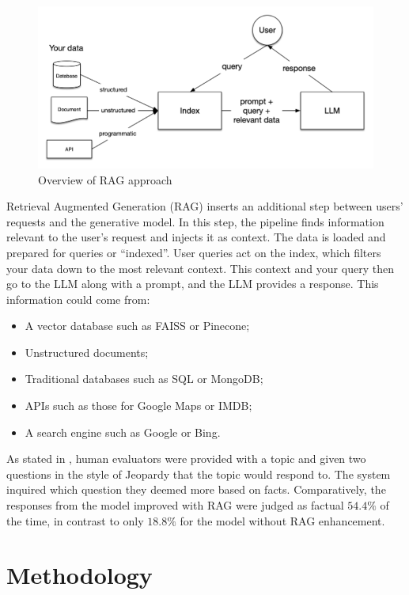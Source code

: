 \documentclass[conference, 11pt]{IEEEtran}
\begin{document}
\begin{figure}[h]
\centering
\includegraphics[width=1.0\linewidth]{basic_rag.png}
\caption{Overview of RAG approach \cite{llamaindex_rag}}
\end{figure}

Retrieval Augmented Generation (RAG) \cite{rag} inserts an additional step between users' requests and the generative model. In this step, the pipeline finds information relevant to the user's request and injects it as context. The data is loaded and prepared for queries or ``indexed''. User queries act on the index, which filters your data down to the most relevant context. This context and your query then go to the LLM along with a prompt, and the LLM provides a response. This information could come from:
\begin{itemize}
    \item A vector database such as FAISS or Pinecone;
    \item Unstructured documents;
    \item Traditional databases such as SQL or MongoDB;
    \item APIs such as those for Google Maps or IMDB;
    \item A search engine such as Google or Bing.
\end{itemize}

As stated in \cite{rag}, human evaluators were provided with a topic and given two questions in the style of Jeopardy that the topic would respond to. The system inquired which question they deemed more based on facts. Comparatively, the responses from the model improved with RAG were judged as factual $54.4\%$ of the time, in contrast to only $18.8\%$ for the model without RAG enhancement.


\section{Methodology}
\end{document}
